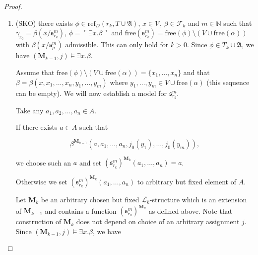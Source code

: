 \documentclass[10pt]{article}
\theoremstyle{plain}
\newcommand{\defeq}{\stackrel{\mathrm{def}}{=}}
\newcommand{\free}{\text{free}}
\newcommand{\sk}{\mathfrak{s}}
\newcommand{\N}{\mathbb{N}}
\newcommand{\F}{\mathcal{F}}
\renewcommand{\L}{\mathscr{L}}
\newcommand{\V}{\mathscr{V}}
\newcommand{\M}{\mathbf{M}}
\newcommand{\refset}{\text{ref}}
\begin{document}
\begin{proof}
\begin{enumerate}
\begin{enumerate}
Take any $a\in A$.  Let
\begin{equation}
j\cfrac{a}{x}(v) \defeq
\begin{cases}
a \text{ if } v = x,\\
j(v) \text{ otherwise}.
\end{cases}
\end{equation}
Since $x\not\in\free(\alpha)$ and $(\M, j)\models\alpha$, we have $(\M, j\cfrac{a}{x})\models\alpha$.
Since $x\not\in\free(\alpha)\cup V$, $j\cfrac{a}{x}$ is an extension of $j_0$ similarily as $j$ is, and since $j$ was arbitrarily chosen, we can repeat the reasoning from (\ref{assumption-alpha}) for an interpretation $j\cfrac{a}{x}$ up to this point and got $(\M_{k-1}, j\cfrac{a}{x})\models \phi$.
This is possible because construction of $\M_{k-1}$ nowhere depends on $j$.
But since $a\in A$ was arbitrary chosen, we have $(\M_{k-1}, j)\models \forall x. \phi $, and thus $(\M_{k-1},j)\models \gamma_{r_k}$. Let $\M_k$ be an arbitrary chosen but fixed $\overline{\L_k}$-structure which is an extension of $\M_{k-1}$. Then $(\M_k,j)\models \gamma_{r_k}$.

\item (SKO) there exists $\phi\in\refset_D({r_k}, T\cup \mathfrak{A})$, $x\in \V$, $\beta\in \F_k$ and $m\in\N$ such that
$\gamma_{r_0} = \beta(x/\sk^m_{r_k})$,
$\phi = \ulcorner \exists x. \beta\urcorner$ and 
$\free(\sk^m_{r_k}) = \free(\phi)\setminus(V\cup \free(\alpha))$ with $\beta(x/\sk^m_\rho)$ admissible. 
This can only hold for $k > 0$.
Since $\phi\in T_k \cup \mathfrak{A}$, we have $(\M_{k-1},j)\models \exists x. \beta$.

Assume that $\free(\phi) \setminus (V \cup \free(\alpha)) = \{x_1, \dots, x_n \}$ and that 
$\beta = \beta(x, x_1, \dots, x_n, y_1, \dots, y_m)$
where $y_1, \dots, y_m\in V \cup \free(\alpha)$ (this sequence can be empty). 
We will now establish a model for $\sk^m_{r_k}$.


Take any $a_1, a_2, \dots, a_n\in A$. 

If there exists $a\in A$ such that

$$
\beta^{\M_{k-1}}(a, a_1, \dots, a_n, j_0(y_1), \dots, j_0(y_m)),
$$ 

we choose such an $a$ and set $(\sk^m_{r_k})^{\M_{k}}(a_1, \dots, a_n) = a$.


Otherwise we set $(\sk^m_{r_k})^{\M_{k}}(a_1, \dots, a_n)$ to arbitrary but fixed element of $A$.

Let $\M_k$ be an arbitrary chosen but fixed $\overline{\L_k}$-structure which is an extension of $\M_{k-1}$ and contains a function $(\sk^m_{r_k})^{\M_k}$ as defined above.
Note that construction of $\M_k$ does not depend on choice of an arbitrary assignment $j$.
Since $(\M_{k-1},j)\models \exists x. \beta$, we have


\end{enumerate}
\end{enumerate}
\end{proof}
\end{document}
